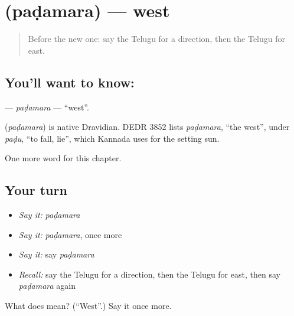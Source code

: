 \section[\texorpdfstring{\te{పడమర} (paḍamara)}{పడమర (paḍamara)}]{ (paḍamara) — west}

\label{lesson:TE-C254-padamara}



\begin{quote}
Before the new one: say the Telugu for a direction, then the Telugu for east.
\end{quote}

\subsection*{You'll want to know: }
\textbf{} — \emph{paḍamara} — \textquotedblleft{}west\textquotedblright{}.

\begin{cousinweb}
\textbf{} (\emph{paḍamara}) is native Dravidian. DEDR 3852 lists \emph{paḍamara}, \textquotedblleft{}the west\textquotedblright{}, under \emph{paḍu}, \textquotedblleft{}to fall, lie\textquotedblright{}, which Kannada uses for the setting sun.
\end{cousinweb}

\begin{grammarlens}[title={What you've built}]
One more word for this chapter.
\end{grammarlens}

\subsection*{Your turn}
\begin{itemize}
\raggedright
  \item \emph{Say it:} \emph{paḍamara}
  \item \emph{Say it:} \emph{paḍamara}, once more
  \item \emph{Say it:} say \emph{paḍamara}
  \item \emph{Recall:} say the Telugu for a direction, then the Telugu for east, then say \emph{paḍamara} again
\end{itemize}

\begin{tcolorbox}[breakable,colback=teal!4,colframe=teal!35!black,title={Before you move on}]
What does  mean? (\textquotedblleft{}West\textquotedblright{}.) Say it once more.
\end{tcolorbox}
